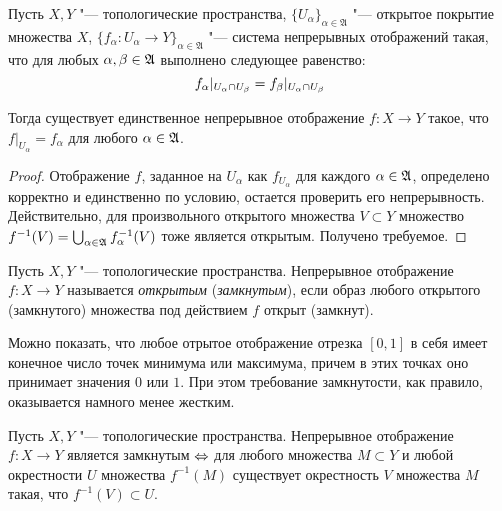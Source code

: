 \begin{theorem}\label{glueingthm}
	Пусть $X, Y$ "--- топологические пространства, $\{U_\alpha \}_{\alpha \in \mathfrak{A}}$ "--- открытое покрытие множества $X$, $\{f_\alpha: U_\alpha \rightarrow Y\}_{\alpha \in \mathfrak{A}}$ "--- сис\-те\-ма непрерывных отображений такая, что для любых $\alpha, \beta \in \mathfrak A$ выполнено следующее равенство:
	\[f_\alpha|_{U_\alpha\cap U_\beta} \hm= f_\beta|_{U_\alpha\cap U_\beta}\]
	
	Тогда существует единственное непрерывное отображение $f: X\rightarrow Y$ такое, что $f|_{U_\alpha} = f_\alpha$ для любого $\alpha \in \mathfrak A$.
\end{theorem}

\begin{proof}
	Отображение $f$, заданное на $U_\alpha$ как $f_{U_\alpha}$ для каждого $\alpha \in \mathfrak A$, определено корректно и единственно по условию, остается проверить его непрерывность. Действительно, для произвольного открытого множества $V \subset Y$ множество $f^{-1}(V) = \bigcup_{\alpha \in \mathfrak A}f_\alpha^{-1}(V)$ тоже является открытым. Получено требуемое.
\end{proof}

\begin{definition}
	Пусть $X, Y$ "--- топологические пространства. Непрерывное отображение $f : X \to Y$ называется \textit{открытым} (\textit{замкнутым}), если образ любого открытого (замкнутого) множества под действием $f$ открыт (замкнут).
\end{definition}

\begin{note}
	Можно показать, что любое отрытое отображение отрезка $[0, 1]$ в себя имеет конечное число точек минимума или максимума, причем в этих точках оно принимает значения $0$ или $1$. При этом требование замкнутости, как правило, оказывается намного менее жестким.
\end{note}

\begin{proposition}
	Пусть $X, Y$ "--- топологические пространства. Непрерывное отображение $f : X \to Y$ является замкнутым $\Leftrightarrow$ для любого множества $M \subset Y$ и любой окрестности $U$ множества $f^{-1}(M)$ существует окрестность $V$ множества $M$ такая, что $f^{-1}(V) \subset U$.
\end{proposition}

